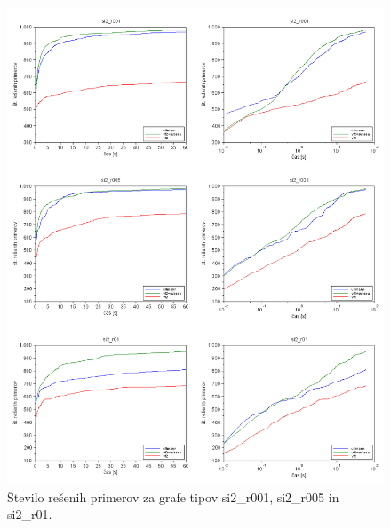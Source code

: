 \documentclass[a4paper, 12pt, ]{book}
\begin{document}
\begin{figure}
\begin{center}
\includegraphics[width=15cm]{img/results_si2.png}
\end{center}
\caption{Število rešenih primerov za grafe tipov  si2\_r001, si2\_r005 in si2\_r01.}
\label{pic_res_si2}
\end{figure}
\end{document}
